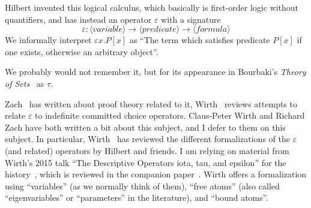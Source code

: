 \label{sec:epsilon-calc}
\begin{node}\label{epsilon-calc-0000}%
Hilbert invented this logical calculus, which basically is first-order
logic without quantifiers, and has instead an operator $\varepsilon$
with a signature
\[\varepsilon\colon\langle\textit{variable}\rangle\to\langle\textit{predicate}\rangle\to\langle\textit{formula}\rangle\]
We informally interpret $\varepsilon x.P[x]$ as ``The term which
satisfies predicate $P[x]$ if one exists, otherwise an arbitrary object''.

We probably would not remember it, but for its appearance in Bourbaki's
\textit{Theory of Sets}~\cite{bourbaki1968theory} as $\tau$.

\begin{node}[References]\label{epsilon-calc-0001}%
Zach~\cite{zach2001practice,zach2016semantics} has written about proof theory related to
it, Wirth~\cite{Wirth2008epsilon,wirth2017simplified} reviews attempts to relate
$\varepsilon$ to indefinite committed choice operators. Claus-Peter Wirth
and Richard Zach have both written a bit about this subject, and I defer
to them on this subject. In particular, Wirth~\cite{wirth2017simplified}
has reviewed the different formalizations of the $\varepsilon$ (and
related) operators by Hilbert and friends.
I am relying on material from Wirth's 2015 talk ``The Descriptive
Operators iota, tau, and epsilon'' for the history~,
which is reviewed in the companion paper~\cite[\S4]{wirth2017simplified}.
Wirth offers a formalization using ``variables'' (as we normally think
of them), ``free atoms'' (also called ``eigenvariables'' or
``parameters'' in the literature), and ``bound atoms''.
\end{node}
\end{node}

